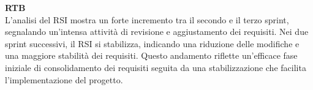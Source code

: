 \begin{flushleft}
\textbf{RTB} \\
L'analisi del RSI mostra un forte incremento tra il secondo e il terzo sprint, segnalando un'intensa attività di revisione e aggiustamento dei requisiti. Nei due sprint successivi, il RSI si stabilizza, indicando una riduzione delle modifiche e una maggiore stabilità dei requisiti. Questo andamento riflette un'efficace fase iniziale di consolidamento dei requisiti seguita da una stabilizzazione che facilita l'implementazione del progetto. \\
\end{flushleft}
